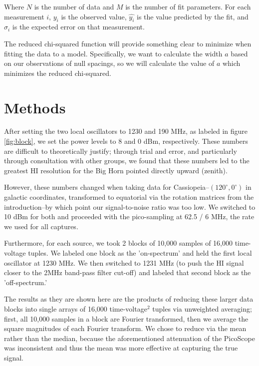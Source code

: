\documentclass[12pt]{article}
\begin{document}
Where $N$ is the number of data and $M$ is the number of fit parameters. For each measurement $i$, $y_i$ is the observed value, $\hat{y_i}$ is the value predicted by the fit, and $\sigma_i$ is the expected error on that measurement.

The reduced chi-squared function will provide something clear to minimize when fitting the data to a model. Specifically, we want to calculate the width $a$ based on our observations of null spacings, so we will calculate the value of $a$ which minimizes the reduced chi-squared.

\section{Methods}


\quad \quad After setting the two local oscillators to 1230 and 190 MHz, as labeled in figure \ref{fig:block}, we set the power levels to 8 and 0 dBm, respectively. These numbers are difficult to theoretically justify; through trial and error, and particularly through consultation with other groups, we found that these numbers led to the greatest HI resolution for the Big Horn pointed directly upward (zenith).

However, these numbers changed when taking data for Cassiopeia--$(120^\circ, 0^\circ)$ in galactic coordinates, transformed to equatorial via the rotation matrices from the introduction--by which point our signal-to-noise ratio was too low. We switched to 10 dBm for both and proceeded with the pico-sampling at 62.5 / 6 MHz, the rate we used for all captures.

Furthermore, for each source, we took 2 blocks of 10,000 samples of 16,000 time-voltage tuples. We labeled one block as the 'on-spectrum' and held the first local oscillator at 1230 MHz. We then switched to 1231 MHz (to push the HI signal closer to the 2MHz band-pass filter cut-off) and labeled that second block as the 'off-spectrum.'

The results as they are shown here are the products of reducing these larger data blocks into single arrays of 16,000 time-voltage$^2$ tuples via unweighted averaging; first, all 10,000 samples in a block are Fourier transformed, then we average the square magnitudes of each Fourier transform. We chose to reduce via the mean rather than the median, because the aforementioned attenuation of the PicoScope was inconsistent and thus the mean was more effective at capturing the true signal.
\end{document}
